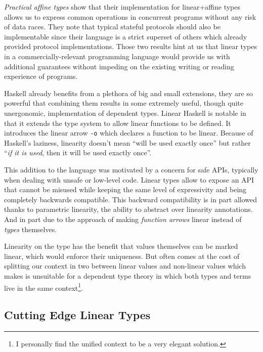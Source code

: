 \documentclass[
]{article}
\begin{document}
\emph{Practical affine types} show that their implementation for
linear+affine types allows us to express common operations in concurrent
programs without any risk of data races\cite{linear_race}. They note
that typical stateful protocols should also be implementable since their
language is a strict superset of others which already provided protocol
implementations. Those two results hint at us that linear types in a
commercially-relevant programming language would provide us with
additional guarantees without impeding on the existing writing or
reading experience of programs.

Haskell already benefits from a plethora of big and small extensions,
they are so powerful that combining them results in some extremely
useful, though quite unergonomic, implementation of dependent
types\cite{hasochism}. Linear Haskell\cite{linear_haskell} is notable in
that it extends the type system to allow linear functions to be defined.
It introduces the linear arrow \texttt{-o} which declares a function to
be linear. Because of Haskell's laziness, linearity doesn't mean ``will
be used exactly once'' but rather ``\emph{if it is used}, then it will
be used exactly once''.

This addition to the language was motivated by a concern for safe APIs,
typically when dealing with unsafe or low-level code. Linear types allow
to expose an API that cannot be misused while keeping the same level of
expressivity and being completely backwards compatible. This backward
compatibility is in part allowed thanks to parametric linearity, the
ability to abstract over linearity annotations. And in part due to the
approach of making \emph{function arrows} linear instead of \emph{types}
themselves.

Linearity on the type has the benefit that values themselves can be
marked linear, which would enforce their uniqueness. But often comes at
the cost of splitting our context in two\cite{lightweight_linear_types}
between linear values and non-linear values which makes is unsuitable
for a dependent type theory in which both types and terms live in the
same context\footnote{I personally find the unified context to be a very
  elegant solution.}.

\hypertarget{cutting-edge-linear-types}{%
\subsection{Cutting Edge Linear Types}\label{cutting-edge-linear-types}}
\end{document}
